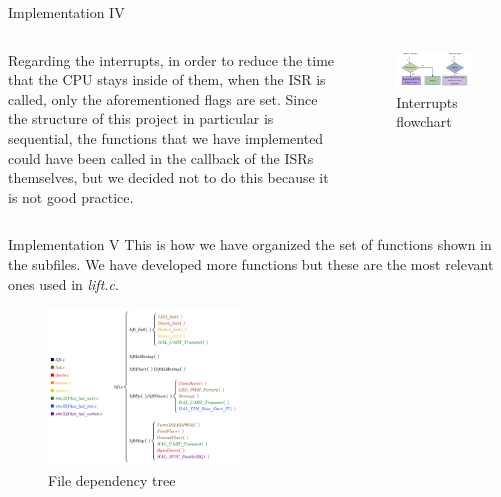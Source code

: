 \documentclass[aspectratio=169]{beamer}
\begin{document}
\begin{frame}{Implementation IV}
\begin{columns}
\begin{column}{0.5\textwidth}
   Regarding the interrupts, in order to reduce the time that the CPU stays inside of them, when the ISR is called, only the aforementioned flags are set. Since the structure of this project in particular is sequential, the functions that we have implemented could have been called in the callback of the ISRs themselves, but we decided not to do this because it is not good practice.
   
\end{column}
\begin{column}{0.5\textwidth}  
    \begin{figure}
    \centering
     \includegraphics[width=1\textwidth]{Graphics/AXGLYPH_PDF/TIM_ISR.pdf}
     \caption{Interrupts flowchart}
     \label{fig:intFlow}
     \end{figure}
\end{column}
\end{columns}
\end{frame}

\begin{frame}{Implementation V}
This is how we have organized the set of functions shown in the subfiles. We have developed more functions but these are the most relevant ones used in \textit{lift.c}.

\begin{figure}[H]
    \centering
    \includegraphics[width=0.45\textwidth]{Graphics/AXGLYPH_PDF/TREE.pdf}
    \caption{File dependency tree}
    \label{fig:File_management}
\end{figure}

\end{frame}
\end{document}
